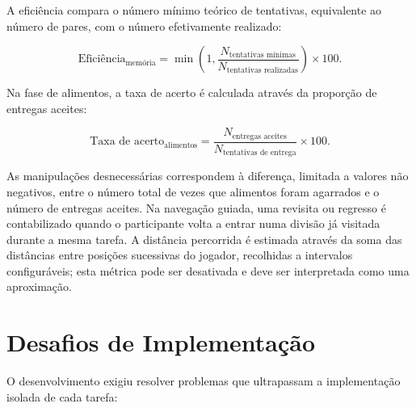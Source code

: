 \documentclass[12pt,a4paper,oneside]{report}
\begin{document}
A eficiência compara o número mínimo teórico de tentativas, equivalente ao número de pares, com o número efetivamente realizado:

\begin{equation}
\text{Eficiência}_{\text{memória}} =
\min\left(1,\frac{N_{\text{tentativas mínimas}}}{N_{\text{tentativas realizadas}}}\right)\times 100.
\end{equation}

Na fase de alimentos, a taxa de acerto é calculada através da proporção de entregas aceites:

\begin{equation}
\text{Taxa de acerto}_{\text{alimentos}} =
\frac{N_{\text{entregas aceites}}}{N_{\text{tentativas de entrega}}}\times 100.
\end{equation}

As manipulações desnecessárias correspondem à diferença, limitada a valores não negativos, entre o número total de vezes que alimentos foram agarrados e o número de entregas aceites. Na navegação guiada, uma revisita ou regresso é contabilizado quando o participante volta a entrar numa divisão já visitada durante a mesma tarefa. A distância percorrida é estimada através da soma das distâncias entre posições sucessivas do jogador, recolhidas a intervalos configuráveis; esta métrica pode ser desativada e deve ser interpretada como uma aproximação.

\section{Desafios de Implementação}

O desenvolvimento exigiu resolver problemas que ultrapassam a implementação isolada de cada tarefa:
\end{document}
